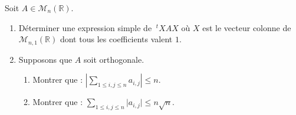 \documentclass[a4paper,twoside,french,11pt]{VcCours}
\begin{document}

\begin{Exercice}{} Soit $A \in \mathcal{M}_n(\mathbb{R})$.

\begin{enumerate}
\item Déterminer une expression simple de $~^tX A X$ où $X$ est le vecteur colonne de $\mathcal{M}_{n,1}(\mathbb{R})$ dont tous les coefficients valent $1$.  
\item Supposons que $A$ soit orthogonale.
\begin{enumerate}
\item Montrer que : $\left\vert \sum_{1 \leq i,j \leq n} a_{i,j} \right\vert \leq n$.
\item Montrer que : $ \sum_{1 \leq i,j \leq n} \vert a_{i,j} \vert  \leq n \sqrt{n}$.
\end{enumerate}
\end{enumerate}
\end{Exercice}
\end{document}

